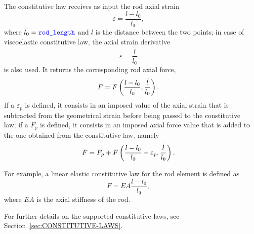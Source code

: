 The constitutive law  receives as input the rod axial strain
\begin{equation}
	\varepsilon = \frac{l - l_0}{l_0} ,
\end{equation}
where $l_0=\textcolor{blue}{\texttt{rod\_length}}$ and $l$ is the distance between the two points;
in case of viscoelastic constitutive law, the axial strain derivative
\begin{equation}
	\dot{\varepsilon} = \frac{\dot{l}}{l_0}
\end{equation}
is also used.
It returns the corresponding rod axial force,
\begin{displaymath}
	F = F\left( \frac{l - l_0}{l_0}, \frac{\dot{l}}{l_0} \right) .
\end{displaymath}
If a  $\varepsilon_p$ is defined,
it consists in an imposed value of the axial strain
that is subtracted from the geometrical strain
before being passed to the constitutive law;
if a  $F_p$ is defined,
it consists in an imposed axial force value
that is added to the one obtained from the constitutive law,
namely
\begin{displaymath}
	F = F_p + F\left( \frac{l - l_0}{l_0} - \varepsilon_p, \frac{\dot{l}}{l_0} \right) .
\end{displaymath}

For example, a linear elastic constitutive law for the rod element
is defined as
\begin{displaymath}
	F = EA \frac{l - l_0}{l_0} ,
\end{displaymath}
where $EA$ is the axial stiffness of the rod.

For further details on the supported constitutive laws, 
see Section~\ref{sec:CONSTITUTIVE-LAWS}.

